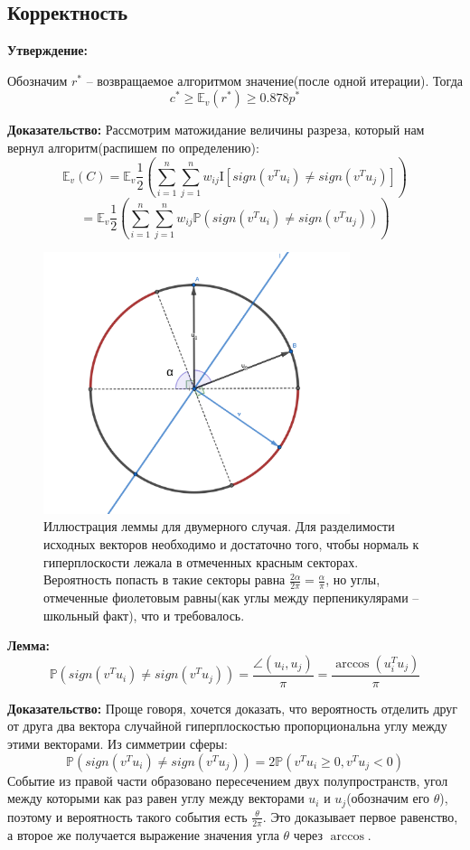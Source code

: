 \documentclass[12pt, a4paper]{article}
\newcommand{\Expect}{\mathbb{E}}
\begin{document}
\subsection{Корректность}
\textbf{Утверждение:}

Обозначим $r^*$ -- возвращаемое алгоритмом значение(после одной итерации). Тогда
$$ c^* \geqslant \Expect_v (r^*) \geqslant 0.878 p^*$$

\textbf{Доказательство:}
Рассмотрим матожидание величины разреза, который нам вернул алгоритм(распишем по определению):
$$ \Expect_v (C) = \Expect_v \frac{1}{2} \left( \sum_{i = 1}^{n} \sum_{j=1}^{n} w_{ij} \mathrm{I}[sign(v^Tu_i) \ne sign(v^Tu_j)] \right)$$
$$ = \Expect_v \frac{1}{2} \left( \sum_{i = 1}^{n} \sum_{j=1}^{n} w_{ij} \mathbb{P}(sign(v^Tu_i) \ne sign(v^Tu_j)) \right)$$

\begin{figure}[h]
\centering
\includegraphics[width=0.8\textwidth]{images/Lemma.png}
\caption[width=0.8\textwidth]{Иллюстрация леммы для двумерного случая. Для разделимости исходных векторов необходимо и достаточно того, чтобы нормаль к гиперплоскости лежала в отмеченных красным секторах. Вероятность попасть в такие секторы равна $\frac{2\alpha}{2\pi} = \frac{\alpha}{\pi}$, но углы, отмеченные фиолетовым равны(как углы между перпеникулярами -- школьный факт), что и требовалось.}
\label{fig:fig2}
\end{figure}

\textbf{Лемма:}
$$\mathbb{P}(sign(v^Tu_i) \ne sign(v^Tu_j)) = \frac{\angle (u_i, u_j)}{\pi} = \frac{\arccos(u_i^T u_j)}{\pi}$$

\textbf{Доказательство:}
Проще говоря, хочется доказать, что вероятность отделить друг от друга два вектора случайной гиперплоскостью пропорциональна углу между этими векторами. Из симметрии сферы:
$$\mathbb{P}(sign(v^Tu_i) \ne sign(v^Tu_j)) = 2\mathbb{P}(v^Tu_i \geqslant 0, v^Tu_j < 0)$$
Событие из правой части образовано пересечением двух полупространств, угол между которыми как раз равен углу между векторами $u_i$ и $u_j$(обозначим его $\theta$), поэтому и вероятность такого события есть $\frac{\theta}{2\pi}$. Это доказывает первое равенство, а второе же получается выражение значения угла $\theta$ через $\arccos$. \\
\null \hfill \square
\end{document}
